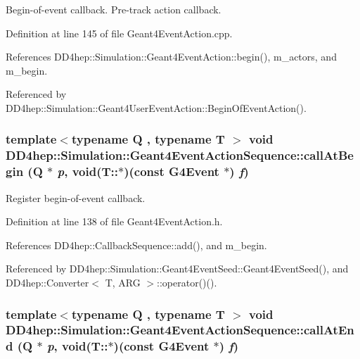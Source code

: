 Begin-\/of-\/event callback. Pre-\/track action callback. 

Definition at line 145 of file Geant4EventAction.cpp.

References DD4hep::Simulation::Geant4EventAction::begin(), m\_\-actors, and m\_\-begin.

Referenced by DD4hep::Simulation::Geant4UserEventAction::BeginOfEventAction().\hypertarget{class_d_d4hep_1_1_simulation_1_1_geant4_event_action_sequence_a83518f996c88a12e92e52446fc4a868b}{
\subsubsection[{callAtBegin}]{\setlength{\rightskip}{0pt plus 5cm}template$<$typename Q , typename T $>$ void DD4hep::Simulation::Geant4EventActionSequence::callAtBegin (Q $\ast$ {\em p}, \/  void(T::$\ast$)(const G4Event $\ast$) {\em f})}}
\label{class_d_d4hep_1_1_simulation_1_1_geant4_event_action_sequence_a83518f996c88a12e92e52446fc4a868b}


Register begin-\/of-\/event callback. 

Definition at line 138 of file Geant4EventAction.h.

References DD4hep::CallbackSequence::add(), and m\_\-begin.

Referenced by DD4hep::Simulation::Geant4EventSeed::Geant4EventSeed(), and DD4hep::Converter$<$ T, ARG $>$::operator()().\hypertarget{class_d_d4hep_1_1_simulation_1_1_geant4_event_action_sequence_a8d53a540711a752831ac7ef62a42e3f3}{
\subsubsection[{callAtEnd}]{\setlength{\rightskip}{0pt plus 5cm}template$<$typename Q , typename T $>$ void DD4hep::Simulation::Geant4EventActionSequence::callAtEnd (Q $\ast$ {\em p}, \/  void(T::$\ast$)(const G4Event $\ast$) {\em f})}}
\label{class_d_d4hep_1_1_simulation_1_1_geant4_event_action_sequence_a8d53a540711a752831ac7ef62a42e3f3}


